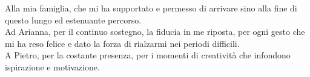 \cleardoublepage
\begingroup
\let\clearpage\endgroup
\null{}

\begin{flushright}
\begin{minipage}{5.2in}
\begin{flushright}
\begin{em}

Alla mia famiglia, che mi ha supportato e permesso di arrivare sino alla fine di questo lungo ed estenuante percorso.\\
Ad Arianna, per il continuo sostegno, la fiducia in me riposta, per ogni gesto che mi ha reso felice e dato la forza di rialzarmi nei periodi difficili.\\
A Pietro, per la costante presenza, per i momenti di creatività che infondono ispirazione e motivazione.

\end{em}
\end{flushright}
\end{minipage}
\end{flushright}
\null
